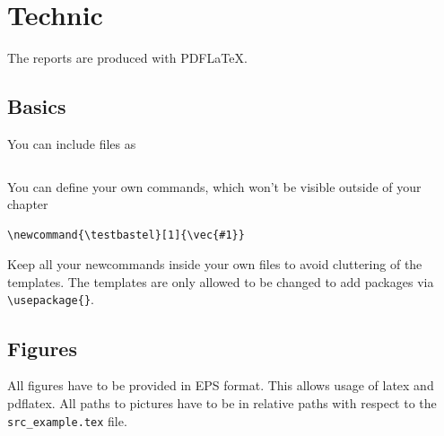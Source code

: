 \section{Technic}

The reports are produced with PDF\LaTeX.

\subsection{Basics}

You can include files as
\begin{verbatim}

\end{verbatim}

You can define your own commands, which won't be visible outside of your chapter
\newcommand{\testbastel}[1]{\vec{#1}}
\begin{verbatim}
\newcommand{\testbastel}[1]{\vec{#1}}
\end{verbatim}
Keep all your newcommands inside your own files to avoid cluttering of the templates. The templates are only allowed to be changed to add packages via \verb|\usepackage{}|.


\subsection{Figures}

All figures have to be provided in EPS format. This allows usage of latex and pdflatex. All paths to pictures have to be in relative paths with respect to the \verb|src_example.tex| file.


